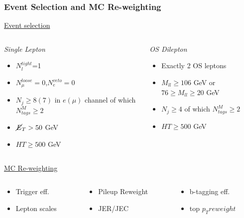\documentclass{beamer}
\begin{document}

\begin{frame}
\frametitle{Event Selection and MC Re-weighting}
	\underline{Event selection}
	\begin{columns}
		\begin{column}{0.5\textwidth}
   			\center \textit{Single Lepton}
			\begin{itemize}
				\item $N_{l}^{tight}$=1
				\item $N_{\mu}^{loose}=0$,$N_{e}^{veto}=0$
				\item $N_{j} \geq 8(7)$ in $e(\mu)$ channel of which $N_{tags}^{M} \geq 2$
				\item $\cancel{E}_{T} > 50$ GeV
				\item $HT \geq 500$ GeV 
			\end{itemize}
		\end{column}
		\begin{column}{0.5\textwidth}
  		 	\center \textit{OS Dilepton} 
			\begin{itemize}
				\item Exactly 2 OS leptons
				\item $M_{ll} \geq 106$ GeV or $76 \geq M_{ll} \geq 20$ GeV
				\item $N_{j} \geq 4$ of which $N_{tags}^{M} \geq 2$
				\item $HT \geq 500$ GeV
			\end{itemize}
		\end{column}
	\end{columns}
	\bigskip
	\underline{MC Re-weighting}
	\begin{columns}
		\begin{column}{0.33\textwidth}
		\begin{itemize}
			\item Trigger eff. 
			\item Lepton scales 
		\end{itemize}
		\end{column}
		\begin{column}{0.33\textwidth}
		\begin{itemize}
			\item Pileup Reweight
			\item JER/JEC
		\end{itemize}
		\end{column}
		\begin{column}{0.33\textwidth}
		\begin{itemize}
			\item b-tagging eff.
			\item top $p_{T} reweight$
		\end{itemize}
		\end{column}
	\end{columns}
\end{frame}
\end{document}
